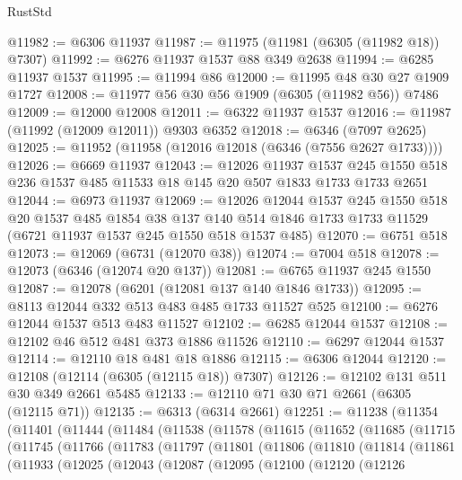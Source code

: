 \begin{lexlean}{RustStd}
\begin{coremodule}
@11982 := @6306 @11937
@11987 := @11975 (@11981 (@6305 (@11982 @18)) @7307)
@11992 := @6276 @11937 @1537 @88 @349 @2638
@11994 := @6285 @11937 @1537
@11995 := @11994 @86
@12000 := @11995 @48 @30 @27 @1909 @1727
@12008 := @11977 @56 @30 @56 @1909 (@6305 (@11982 @56)) @7486
@12009 := @12000 @12008
@12011 := @6322 @11937 @1537
@12016 := @11987 (@11992 (@12009 @12011)) @9303 @6352
@12018 := @6346 (@7097 @2625)
@12025 := @11952 (@11958 (@12016 @12018 (@6346 (@7556 @2627 @1733))))
@12026 := @6669 @11937
@12043 := @12026
    @11937
    @1537
    @245
    @1550
    @518
    @236
    @1537
    @485
    @11533
    @18
    @145
    @20
    @507
    @1833
    @1733
    @1733
    @2651
@12044 := @6973 @11937
@12069 := @12026
    @12044
    @1537
    @245
    @1550
    @518
    @20
    @1537
    @485
    @1854
    @38
    @137
    @140
    @514
    @1846
    @1733
    @1733
    @11529
    (@6721 @11937 @1537 @245 @1550 @518 @1537 @485)
@12070 := @6751 @518
@12073 := @12069 (@6731 (@12070 @38))
@12074 := @7004 @518
@12078 := @12073 (@6346 (@12074 @20 @137))
@12081 := @6765 @11937 @245 @1550
@12087 := @12078 (@6201 (@12081 @137 @140 @1846 @1733))
@12095 := @8113 @12044 @332 @513 @483 @485 @1733 @11527 @525
@12100 := @6276 @12044 @1537 @513 @483 @11527
@12102 := @6285 @12044 @1537
@12108 := @12102 @46 @512 @481 @373 @1886 @11526
@12110 := @6297 @12044 @1537
@12114 := @12110 @18 @481 @18 @1886
@12115 := @6306 @12044
@12120 := @12108 (@12114 (@6305 (@12115 @18)) @7307)
@12126 := @12102 @131 @511 @30 @349 @2661 @5485
@12133 := @12110 @71 @30 @71 @2661 (@6305 (@12115 @71))
@12135 := @6313 (@6314 @2661)
@12251 := @11238
    (@11354
      (@11401
        (@11444
          (@11484
            (@11538
              (@11578
                (@11615
                  (@11652
                    (@11685
                      (@11715
                        (@11745
                          (@11766
                            (@11783
                              (@11797
                                (@11801
                                  (@11806
                                    (@11810
                                      (@11814
                                        (@11861
                                          (@11933
                                            (@12025
                                              (@12043
                                                (@12087
                                                  (@12095
                                                    (@12100
                                                      (@12120
                                                        (@12126

\end{coremodule}
\end{lexlean}
